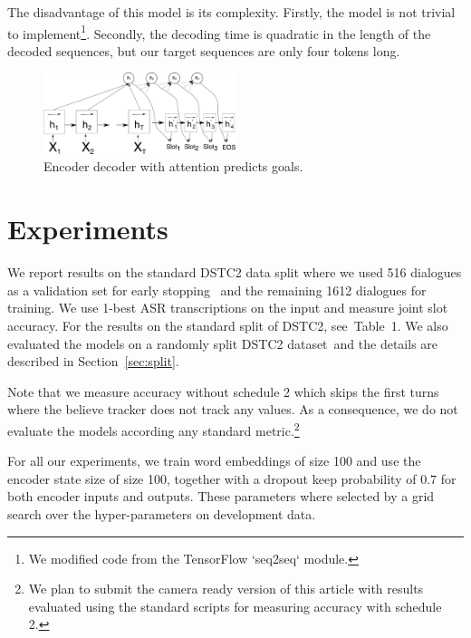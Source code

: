 \documentclass{itatnew}
\def\PB#1{\textcolor{red}{PB: \textit{#1}}}
\begin{document}
The disadvantage of this model is its complexity.
Firstly, the model is not trivial to implement\footnote{We modified code from the TensorFlow `seq2seq` module.}. 
Secondly, the decoding time is quadratic in the length of the decoded sequences, but our target sequences are only four tokens long.
\begin{figure}
\includegraphics[width=0.5\textwidth]{encdec}
\caption{Encoder decoder with attention predicts goals.}
\label{fig:encdec}
\end{figure}

\section{Experiments}
\label{sec:exp}
We report results on the standard DSTC2 data split where we used 516 dialogues as a validation set for early stopping~\cite{prechelt1998early} and the remaining 1612 dialogues for training.
We use 1-best ASR transcriptions on the input and measure joint slot accuracy.
For the results on the standard split of DSTC2, see~Table~1.
We also evaluated the models on a randomly split DSTC2 dataset\, and the details are described in Section~\ref{sec:split}.


Note that we measure accuracy without schedule 2 which skips the first turns where the believe tracker does not track any values. As a consequence, we do not evaluate the models according any  standard metric.\footnote{We plan to submit the camera ready version of this article with results evaluated using the standard scripts for measuring accuracy with schedule 2.}


For all our experiments, we train word embeddings of size 100 and use the encoder state size of size 100, together with a dropout keep probability of $0.7$ for both encoder inputs and outputs.
These parameters where selected by a grid search over the hyper-parameters on development data.
\end{document}
